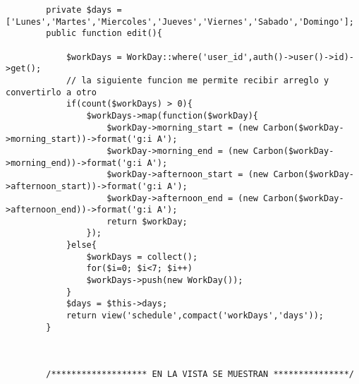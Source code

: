 \documentclass[a4paper]{article}
\begin{document}
	\begin{lstlisting}
		private $days = ['Lunes','Martes','Miercoles','Jueves','Viernes','Sabado','Domingo'];
		public function edit(){
			
			$workDays = WorkDay::where('user_id',auth()->user()->id)->get();
			// la siguiente funcion me permite recibir arreglo y convertirlo a otro
			if(count($workDays) > 0){
				$workDays->map(function($workDay){
					$workDay->morning_start = (new Carbon($workDay->morning_start))->format('g:i A');
					$workDay->morning_end = (new Carbon($workDay->morning_end))->format('g:i A');
					$workDay->afternoon_start = (new Carbon($workDay->afternoon_start))->format('g:i A');
					$workDay->afternoon_end = (new Carbon($workDay->afternoon_end))->format('g:i A');
					return $workDay;
				});
			}else{
				$workDays = collect();
				for($i=0; $i<7; $i++)
				$workDays->push(new WorkDay());
			}
			$days = $this->days;
			return view('schedule',compact('workDays','days'));
		}
	
	
	
		/******************* EN LA VISTA SE MUESTRAN ***************/
		

\end{lstlisting}
\end{document}
